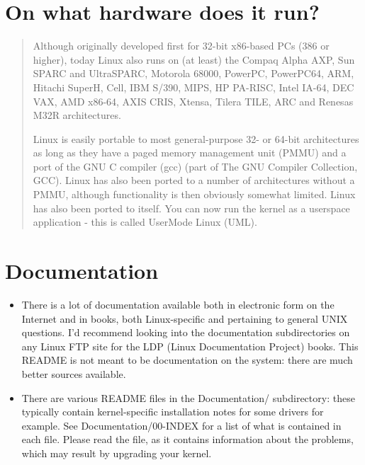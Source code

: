 \documentclass[a4paper,8pt,english]{sphinxmanual}
\begin{document}
\section{On what hardware does it run?}
\label{admin-guide/README:on-what-hardware-does-it-run}\begin{quote}

Although originally developed first for 32-bit x86-based PCs (386 or higher),
today Linux also runs on (at least) the Compaq Alpha AXP, Sun SPARC and
UltraSPARC, Motorola 68000, PowerPC, PowerPC64, ARM, Hitachi SuperH, Cell,
IBM S/390, MIPS, HP PA-RISC, Intel IA-64, DEC VAX, AMD x86-64, AXIS CRIS,
Xtensa, Tilera TILE, ARC and Renesas M32R architectures.

Linux is easily portable to most general-purpose 32- or 64-bit architectures
as long as they have a paged memory management unit (PMMU) and a port of the
GNU C compiler (gcc) (part of The GNU Compiler Collection, GCC). Linux has
also been ported to a number of architectures without a PMMU, although
functionality is then obviously somewhat limited.
Linux has also been ported to itself. You can now run the kernel as a
userspace application - this is called UserMode Linux (UML).
\end{quote}


\section{Documentation}
\label{admin-guide/README:documentation}\begin{itemize}
\item {} 
There is a lot of documentation available both in electronic form on
the Internet and in books, both Linux-specific and pertaining to
general UNIX questions.  I'd recommend looking into the documentation
subdirectories on any Linux FTP site for the LDP (Linux Documentation
Project) books.  This README is not meant to be documentation on the
system: there are much better sources available.

\item {} 
There are various README files in the Documentation/ subdirectory:
these typically contain kernel-specific installation notes for some
drivers for example. See Documentation/00-INDEX for a list of what
is contained in each file.  Please read the
 file, as it
contains information about the problems, which may result by upgrading
your kernel.

\end{itemize}
\end{document}
